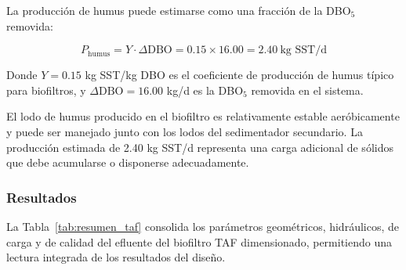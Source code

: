 \documentclass[12pt,a4paper]{article}
\begin{document}
La producción de humus puede estimarse como una fracción de la DBO$_5$ removida:

\begin{equation}
P_{\text{humus}} = Y \cdot \Delta\text{DBO} = 0.15 \times 16.00 = 2.40\ \text{kg SST/d}
\end{equation}

Donde $Y = 0.15$ kg SST/kg DBO es el coeficiente de producción de humus típico para biofiltros, y $\Delta\text{DBO} = 16.00$ kg/d es la DBO$_5$ removida en el sistema.

El lodo de humus producido en el biofiltro es relativamente estable aeróbicamente y puede ser manejado junto con los lodos del sedimentador secundario. La producción estimada de 2.40 kg SST/d representa una carga adicional de sólidos que debe acumularse o disponerse adecuadamente.

\subsubsection{Resultados}

La Tabla~\ref{tab:resumen_taf} consolida los parámetros geométricos, hidráulicos, de carga y de calidad del efluente del biofiltro TAF dimensionado, permitiendo una lectura integrada de los resultados del diseño.
\end{document}
